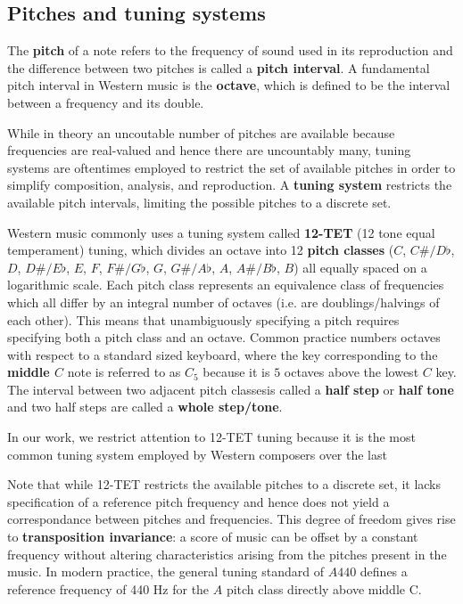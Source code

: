 \subsection{Pitches and tuning systems}

The \textbf{pitch} of a note refers to the frequency of sound used in its
reproduction and the difference between two pitches is called a \textbf{pitch
interval}. A fundamental pitch interval in Western music is the
\textbf{octave}, which is defined to be the interval between a frequency and
its double.

While in theory an uncoutable number of pitches are available because
frequencies are real-valued and hence there are uncountably many, tuning
systems are oftentimes employed to restrict the set of available pitches in
order to simplify composition, analysis, and reproduction. A \textbf{tuning
system} restricts the available pitch intervals, limiting the possible pitches
to a discrete set.

Western music commonly uses a tuning system called \textbf{12-TET} (12 tone
equal temperament) tuning, which divides an octave into 12 \textbf{pitch
classes} ($C$, $C\#/D\flat$, $D$, $D\#/E\flat$, $E$, $F$, $F\#/G\flat$, $G$,
$G\#/A\flat$, $A$, $A\#/B\flat$, $B$) all equally spaced on a logarithmic
scale. Each pitch class represents an equivalence class of frequencies which
all differ by an integral number of octaves (i.e. are doublings/halvings of
each other). This means that unambiguously specifying a pitch requires
specifying both a pitch class and an octave. Common practice numbers octaves
with respect to a standard sized keyboard, where the key corresponding to the
\textbf{middle $C$} note is referred to as $C_5$ because it is $5$ octaves
above the lowest $C$ key. The interval between two adjacent pitch classesis
called a \textbf{half step} or \textbf{half tone} and two half steps are called
a \textbf{whole step/tone}.

In our work, we restrict attention to 12-TET tuning because it is the most
common tuning system employed by Western composers over the last 

Note that while 12-TET restricts the available pitches to a discrete set, it
lacks specification of a reference pitch frequency and hence does not yield a
correspondance between pitches and frequencies. This degree of freedom gives
rise to \textbf{transposition invariance}: a score of music can be offset by a
constant frequency without altering characteristics arising from the pitches
present in the music. In modern practice, the general tuning standard of $A440$
defines a reference frequency of 440 Hz for the $A$ pitch class directly above
middle C.

